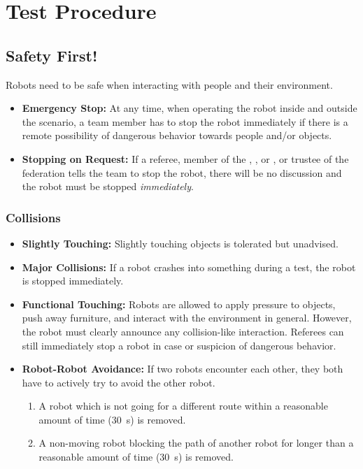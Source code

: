 \section{Test Procedure}
\label{sec:rules:testprocedure}

\subsection{Safety First!}
\label{sec:rules:safetyfirst}
Robots need to be safe when interacting with people and their environment.
\begin{itemize}
	\item \textbf{Emergency Stop:} At any time, when operating the robot inside and outside the scenario, a team member has to stop the robot immediately if there is a remote possibility of dangerous behavior towards people and/or objects.
	\item \textbf{Stopping on Request:} If a referee, member of the , , or , or trustee of the federation tells the team to stop the robot, there will be no discussion and the robot must be stopped \emph{immediately}.
\end{itemize}

\subsubsection{Collisions}
\label{sec:rules:collisions}
\begin{itemize}
	\item \textbf{Slightly Touching:} Slightly touching objects is tolerated but unadvised.
	
	\item \textbf{Major Collisions:} If a robot crashes into something during a test, the robot is stopped immediately.
	
	\item \textbf{Functional Touching:} Robots are allowed to apply pressure to objects, push away furniture, and interact with the environment in general. However, the robot must clearly announce any collision-like interaction. Referees can still immediately stop a robot in case or suspicion of dangerous behavior.
	
	\item \textbf{Robot-Robot Avoidance:} If two robots encounter each other, they both have to actively try to avoid the other robot.
	\begin{enumerate}
		\item A robot which is not going for a different route within a reasonable amount of time (\SI{30}{\second}) is removed.
		\item A non-moving robot blocking the path of another robot for longer than a reasonable amount of time (\SI{30}{\second}) is removed.
	\end{enumerate}
\end{itemize}

